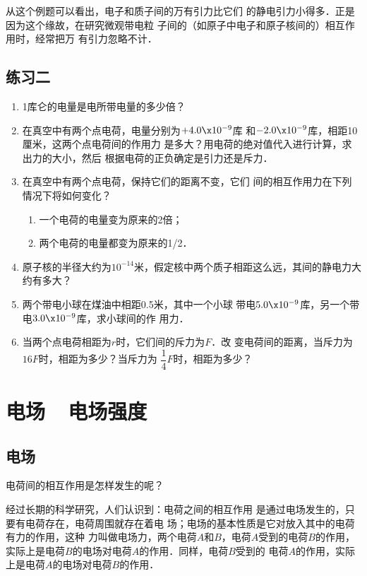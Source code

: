 从这个例题可以看出，电子和质子间的万有引力比它们
的静电引力小得多．正是因为这个缘故，在研究微观带电粒
子间的（如原子中电子和原子核间的）相互作用时，经常把万
有引力忽略不计．



\subsection*{练习二}

\begin{enumerate}
	\item 1库仑的电量是电所带电量的多少倍？
	\item 在真空中有两个点电荷，电量分别为$+4.0\x10^{-9}$库
和$-2.0\x10^{-9}$库，相距10厘米，这两个点电荷间的作用力
是多大？用电荷的绝对值代入进行计算，求出力的大小，然后
根据电荷的正负确定是引力还是斥力．
\item 在真空中有两个点电荷，保持它们的距离不变，它们
间的相互作用力在下列情况下将如何变化？
\begin{enumerate}
	\item 一个电荷的电量变为原来的2倍；
	\item 两个电荷的电量都变为原来的1/2．
\end{enumerate}
\item 原子核的半径大约为$10^{-14}$米，假定核中两个质子相距这么远，其间的静电力大约有多大？
\item 两个带电小球在煤油中相距0.5米，其中一个小球
带电$5.0\x10^{-9}$库，另一个带电$3.0\x10^{-9}$库，求小球间的作
用力．
\item 当两个点电荷相距为$r$时，它们间的斥力为$F$．改
变电荷间的距离，当斥力为$16F$时，相距为多少？当斥力为
$\dfrac{1}{4}F$时，相距为多少？
\end{enumerate}


\section{电场~~电场强度}

\subsection{电场}
电荷间的相互作用是怎样发生的呢？

经过长期的科学研究，人们认识到：电荷之间的相互作用
是通过电场发生的，只要有电荷存在，电荷周围就存在着电
场；电场的基本性质是它对放入其中的电荷有力的作用，这种
力叫做电场力，两个电荷$A$和$B$，电荷$A$受到的电荷$B$的作用，
实际上是电荷$B$的电场对电荷$A$的作用．同样，电荷$B$受到的
电荷$A$的作用，实际上是电荷$A$的电场对电荷$B$的作用．

